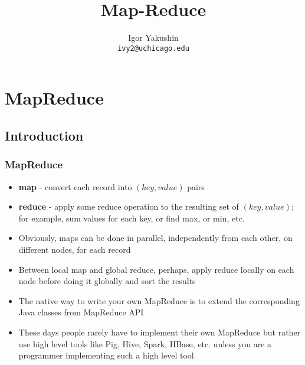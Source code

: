 \documentclass{beamer}
\title{\huge{Map-Reduce}}
\author{Igor Yakushin \\ \texttt{ivy2@uchicago.edu}}
\begin{document}



\begin{frame}
\titlepage
\end{frame}



\section{MapReduce}
\subsection{Introduction}
\begin{frame}
 \frametitle{MapReduce}
 \begin{itemize}
  \item {\color{mycolordef}\textbf{map}} - convert each record into $(key, value)$ pairs
  \item {\color{mycolordef}\textbf{reduce}} - apply some reduce operation to the resulting set of $(key, value)$; for example, sum values for each key, or find max, or min, etc.
  \item Obviously, maps can be done in parallel, independently from each other, on different nodes, for each record
  \item Between local map and global reduce, perhaps, apply reduce locally on each node before doing it globally and sort the results
  \item The native way to write your own MapReduce is to extend the corresponding Java classes from MapReduce API
  \item These days people rarely have to implement their own MapReduce but rather use high level tools like Pig, Hive, Spark, HBase, etc. unless you 
    are a programmer implementing such a high level tool
  \end{itemize}
\end{frame}
\end{document}
